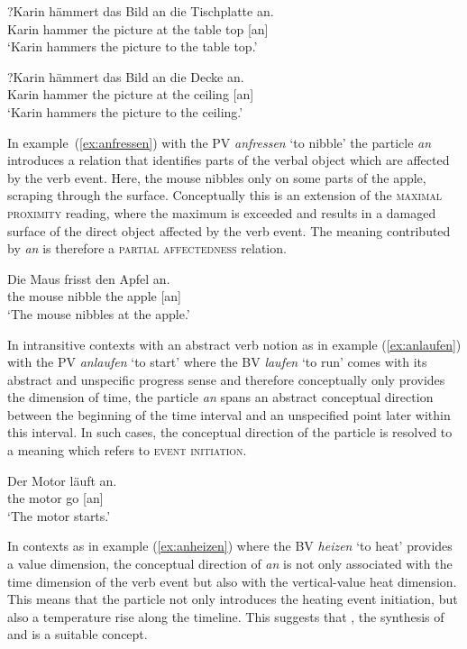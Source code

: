\documentclass[output=paper]{langsci/langscibook}
\begin{document}
\ea\label{ex:anhaemmernTischplatte}
\gll ?Karin hämmert das Bild an die Tischplatte an.\\
Karin hammer the picture at the {table top} [an]\\
\glt `Karin hammers the picture to the table top.'
\z

\ea\label{ex:anhaemmernDecke}
\gll ?Karin hämmert das Bild an die Decke an.\\
Karin hammer the picture at the ceiling [an]\\
\glt `Karin hammers the picture to the ceiling.'
\z

In example~(\ref{ex:anfressen}) with the PV \textit{anfressen} `to
nibble' the particle \textit{an} introduces a relation that
identifies parts of the verbal object which are affected by the verb
event. Here, the mouse nibbles only on some parts of the apple,
scraping through the surface. Conceptually this is an extension of the
\textsc{maximal proximity} reading, where the maximum is exceeded and
results in a damaged surface of the direct object affected by the verb
event. The meaning contributed by \textit{an} is therefore a
\textsc{partial affectedness} relation.

\ea\label{ex:anfressen}
\gll Die Maus frisst den Apfel an.\\
the mouse nibble the apple [an]\\
\glt `The mouse nibbles at the apple.'
\z

In intransitive contexts with an abstract verb notion as in example
(\ref{ex:anlaufen}) with the PV \textit{anlaufen} `to start' where
the BV \textit{laufen} `to run' comes with its abstract and
unspecific progress sense and therefore conceptually only provides the
dimension of time, the particle \textit{an} spans an abstract
conceptual direction between the beginning of the time interval and an
unspecified point later within this interval. In such cases, the
conceptual direction of the particle is resolved to a meaning which
refers to \textsc{event initiation}.

\ea\label{ex:anlaufen}
\gll Der Motor läuft an.\\
the motor go [an]\\
\glt `The motor starts.'
\z

In contexts as in example (\ref{ex:anheizen}) where the BV
\textit{heizen} `to heat' provides a value dimension, the conceptual
direction of \textit{an} is not only associated with the time
dimension of the verb event but also with the vertical-value heat
dimension. This means that the particle not only introduces the
heating event initiation, but also a temperature rise along the
timeline. This suggests that , the synthesis of
 and  is a suitable concept.
\end{document}

